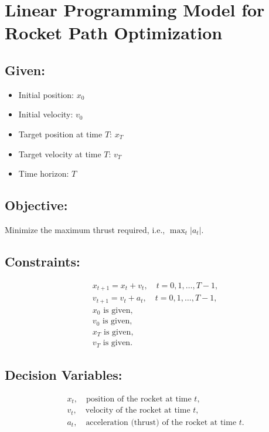 \documentclass{article}
\begin{document}
\section*{Linear Programming Model for Rocket Path Optimization}

\subsection*{Given:}
\begin{itemize}
    \item Initial position: \(x_0\)
    \item Initial velocity: \(v_0\)
    \item Target position at time \(T\): \(x_T\)
    \item Target velocity at time \(T\): \(v_T\)
    \item Time horizon: \(T\)
\end{itemize}

\subsection*{Objective:}
Minimize the maximum thrust required, i.e., \(\max_{t} |a_t|\).

\subsection*{Constraints:}
\begin{align}
    & x_{t+1} = x_t + v_t, \quad t = 0, 1, \ldots, T-1, \\
    & v_{t+1} = v_t + a_t, \quad t = 0, 1, \ldots, T-1, \\
    & x_0 \text{ is given}, \\
    & v_0 \text{ is given}, \\
    & x_T \text{ is given}, \\
    & v_T \text{ is given}.
\end{align}

\subsection*{Decision Variables:}
\begin{align}
    & x_t, \quad \text{position of the rocket at time } t, \\
    & v_t, \quad \text{velocity of the rocket at time } t, \\
    & a_t, \quad \text{acceleration (thrust) of the rocket at time } t.
\end{align}
\end{document}
